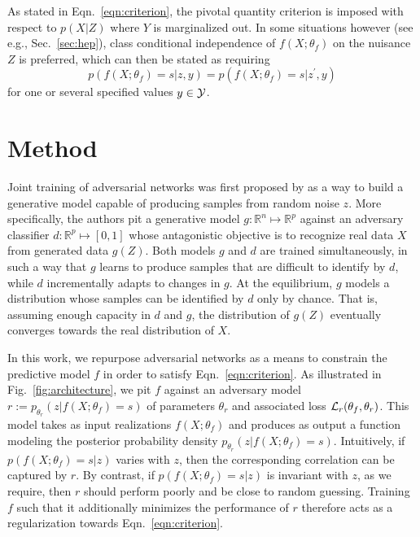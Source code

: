 \documentclass{article}
\theoremstyle{plain}
\begin{document}
As stated in Eqn.~\ref{eqn:criterion}, the pivotal quantity criterion is
imposed with respect to $p(X|Z)$ where $Y$ is marginalized out. In some situations
however (see e.g., Sec.~\ref{sec:hep}), class conditional independence of $f(X;
\theta_f)$ on the nuisance $Z$ is preferred, which can then be stated as
requiring
\begin{equation}\label{eqn:criterion-class}
    p(f(X ; \theta_f) = s | z, y ) = p(f(X ; \theta_f) = s | z^\prime, y )
\end{equation}
for one or several specified values $y \in {\cal Y}$.



\section{Method}
\label{sec:method}

Joint training of adversarial networks was first proposed by \citep{goodfellow2014generative} as a
way to build a generative model capable of producing samples from random noise
$z$. More specifically, the authors pit a generative model $g:
\mathbb{R}^n \mapsto \mathbb{R}^p$ against an adversary classifier $d :
\mathbb{R}^p \mapsto [0, 1]$ whose antagonistic objective is to recognize
real data $X$ from generated data $g(Z)$. Both models $g$ and $d$ are trained
simultaneously, in such a way that $g$ learns to produce samples that are
difficult to identify by $d$, while $d$ incrementally adapts to changes in $g$.
At the equilibrium, $g$ models a distribution whose samples can be identified by
$d$ only by chance. That is, assuming enough capacity in $d$ and  $g$, the
distribution of $g(Z)$ eventually converges towards the real distribution
of $X$.

In this work, we repurpose adversarial networks as a means to constrain the
predictive model $f$ in order to satisfy Eqn.~\ref{eqn:criterion}. As
illustrated in Fig.~\ref{fig:architecture}, we pit $f$ against an adversary
model $r := p_{\theta_r}(z | f(X;\theta_f)=s)$ of parameters $\theta_r$ and
associated loss ${\cal L}_r(\theta_f, \theta_r)$. This model takes  as input
realizations $f(X; \theta_f)$ and produces as output a function
modeling the posterior probability density $p_{\theta_r}(z | f(X;\theta_f)=s)$.
Intuitively, if $p(f(X; \theta_f)=s|z)$ varies with $z$,
then the corresponding correlation can be captured by $r$. By contrast, if
$p(f(X; \theta_f)=s|z)$ is invariant with $z$, as we require, then $r$ should
perform poorly and be close to random guessing. Training $f$ such that it
additionally minimizes the performance of $r$ therefore acts as a regularization
towards Eqn.~\ref{eqn:criterion}.
\end{document}
